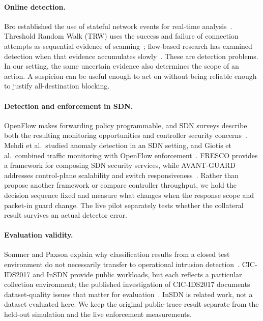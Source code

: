 \documentclass[conference]{IEEEtran}
\begin{document}
\paragraph{Online detection.}
Bro established the use of stateful network events for real-time analysis~\cite{paxson1999bro}.
Threshold Random Walk (TRW) uses the success and failure of connection attempts as sequential
evidence of scanning~\cite{jung2004trw}; flow-based research has examined detection when that
evidence accumulates slowly~\cite{ring2018slow}. These are detection problems. In our setting,
the same uncertain evidence also determines the scope of an action. A suspicion can be useful
enough to act on without being reliable enough to justify all-destination blocking.

\paragraph{Detection and enforcement in SDN.}
OpenFlow makes forwarding policy programmable, and SDN surveys describe both the resulting
monitoring opportunities and controller security concerns~\cite{mckeown2008openflow,kreutz2015sdn,janabi2024survey}.
Mehdi et al.\ studied anomaly detection in an SDN setting, and Giotis et al.\ combined
traffic monitoring with OpenFlow enforcement~\cite{mehdi2011revisiting,giotis2014combining}.
FRESCO provides a framework for composing SDN security services, while AVANT-GUARD addresses
control-plane scalability and switch responsiveness~\cite{shin2013fresco,shin2013avantguard}.
Rather than propose another framework or compare controller throughput, we hold the decision
sequence fixed and measure what changes when the response scope and packet-in guard change.
The live pilot separately tests whether the collateral result survives an actual detector error.

\paragraph{Evaluation validity.}
Sommer and Paxson explain why classification results from a closed test environment do not
necessarily transfer to operational intrusion detection~\cite{sommer2010closed}.
CIC-IDS2017 and InSDN provide public workloads, but each reflects a particular collection
environment; the published investigation of CIC-IDS2017 documents dataset-quality issues
that matter for evaluation~\cite{sharafaldin2018cicids,elsayed2020insdn,engelen2021troubleshooting}.
InSDN is related work, not a dataset evaluated here. We keep the original public-trace
result separate from the held-out simulation and the live enforcement measurements.
\end{document}
